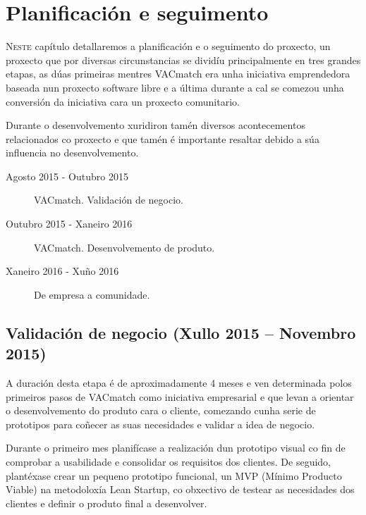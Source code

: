 \chapter{Planificación e seguimento}
\minitoc


  \lettrine{N}{este} capítulo detallaremos a planificación e o seguimento 
do proxecto, un proxecto que por diversas circunstancias se dividíu 
principalmente en tres grandes etapas, as dúas primeiras mentres VACmatch era 
unha iniciativa emprendedora baseada nun proxecto software libre e a última 
durante a cal se comezou unha conversión da iniciativa cara un proxecto 
comunitario.

  Durante o desenvolvemento xuridiron tamén diversos acontecementos 
relacionados co proxecto e que tamén é importante resaltar debido a súa 
influencia no desenvolvemento.

  \begin{description}
    \item [Agosto 2015 - Outubro 2015] VACmatch. Validación de negocio.
    \item [Outubro 2015 - Xaneiro 2016] VACmatch. Desenvolvemento de produto.
    \item [Xaneiro 2016 - Xuño 2016] De empresa a comunidade.
  \end{description}


  \section{Validación de negocio (Xullo 2015 -- Novembro 2015)}
  A duración desta etapa é de aproximadamente 4 meses e ven determinada polos 
primeiros pasos de VACmatch como iniciativa empresarial e que levan a orientar 
o desenvolvemento do produto cara o cliente, comezando cunha serie de 
prototipos para coñecer as suas necesidades e validar a idea de 
negocio.

  Durante o primeiro mes planifícase a realización dun prototipo visual co 
fin de comprobar a usabilidade e consolidar os requisitos dos clientes.
  De seguido, plantéxase crear un pequeno prototipo funcional, un MVP (Mínimo 
Producto Viable) na metodoloxía Lean Startup, co obxectivo de testear as 
necesidades dos clientes e definir o produto final a desenvolver.

